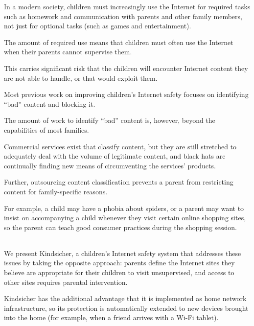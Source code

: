 In a modern society, children must increasingly use the Internet for required
tasks such as homework and communication with parents and other family
members, not just for optional tasks (such as games and entertainment).

The amount of required use means that children must often use the Internet
when their parents cannot supervise them.

This carries significant risk that the children will encounter Internet
content they are not able to handle, or that would exploit them.

Most previous work on improving children's Internet safety focuses on
identifying ``bad'' content and blocking it.

The amount of work to identify ``bad'' content is, however, beyond the
capabilities of most families.

Commercial services exist that classify content, but they are still stretched
to adequately deal with the volume of legitimate content, and black hats are
continually finding new means of circumventing the services' products.

Further, outsourcing content classification prevents a parent from restricting
content for family-specific reasons.

For example, a child may have a phobia about spiders, or a parent may want to
insist on accompanying a child whenever they visit certain online shopping
sites, so the parent can teach good consumer practices during the shopping
session.

\\

We present Kindsicher, a children's Internet safety system that addresses
these issues by taking the opposite approach: parents define the Internet
sites they believe are appropriate for their children to visit unsupervised,
and access to other sites requires parental intervention.

Kindsicher has the additional advantage that it is implemented as home network
infrastructure, so its protection is automatically extended to new devices
brought into the home (for example, when a friend arrives with a Wi-Fi
tablet).

